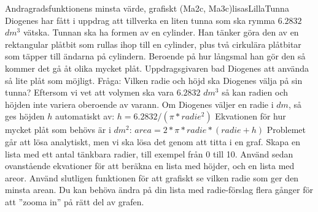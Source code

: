 \begin{matteovningm}{Andragradsfunktionens minsta värde, grafiskt (Ma2c, Ma3c)}{lisasLillaTunna}
	Diogenes har fått i uppdrag att tillverka en liten tunna som ska rymma $6.2832$ $dm^3$ vätska. Tunnan ska ha formen av en cylinder. Han tänker göra den av en rektangular plåtbit som rullas ihop till en cylinder, plus två cirkulära plåtbitar som täpper till ändarna på cylindern. Beroende på hur långsmal han gör den så kommer det gå åt olika mycket plåt. Uppdragsgivaren bad Diogenes att använda så lite plåt som möjligt.
\newline
\newline
Fråga: Vilken radie och höjd ska Diogenes välja på sin tunna?
\newline
\newline
Eftersom vi vet att volymen ska vara $6.2832$ $dm^3$ så kan radien och höjden inte variera oberoende av varann. Om Diogenes väljer en radie i $dm$, så ges höjden $h$ automatiskt av:
\newline
\newline
$h = 6.2832 / (\pi * radie^2)$
\newline
\newline
Ekvationen för hur mycket plåt som behövs är i $dm^2$:
\newline
\newline
$area = 2 * \pi * radie * (radie + h)$
\newline
\newline
Problemet går att lösa analytiskt, men vi ska lösa det genom att titta i en graf. Skapa en lista med ett antal tänkbara radier, till exempel från 0 till 10. Använd sedan ovanstående ekvationer för att beräkna en lista med höjder, och en lista med areor. Använd slutligen funktionen  för att grafiskt se vilken radie som ger den minsta arean. Du kan behöva ändra på din lista med radie-förslag flera gånger för att ''zooma in'' på rätt del av grafen.
\end{matteovningm}


\newpage
